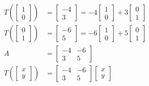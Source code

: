 \documentclass[main.tex]{subfiles}
\begin{document}
\begin{enumerate}
\begin{enumerate}
        $$
        \begin{aligned}
        T\left(\left[\begin{array}{l}
        1 \\
        0
        \end{array}\right]\right)&=\left[\begin{array}{c}
        -4 \\
        3
        \end{array}\right]=-4\left[\begin{array}{l}
        1 \\
        0
        \end{array}\right]+3\left[\begin{array}{l}
        0 \\
        1
        \end{array}\right] \\
        T\left(\left[\begin{array}{l}
        0 \\
        1
        \end{array}\right]\right)&=\left[\begin{array}{c}
        -6 \\
        5
        \end{array}\right]=-6\left[\begin{array}{l}
        1 \\
        0
        \end{array}\right]+5\left[\begin{array}{l}
        0 \\
        1
        \end{array}\right]\\
        A&=\left[\begin{array}{cc}
        -4 & -6 \\
        3 & 5
        \end{array}\right] \\
        T\left(\left[\begin{array}{l}
        x \\
        y
        \end{array}\right]\right)&=\left[\begin{array}{cc}
        -4 & -6 \\
        3 & 5
        \end{array}\right]\left[\begin{array}{l}
        x \\
        y
        \end{array}\right]
        \end{aligned}
        $$
        

\end{enumerate}
\end{enumerate}
\end{document}
